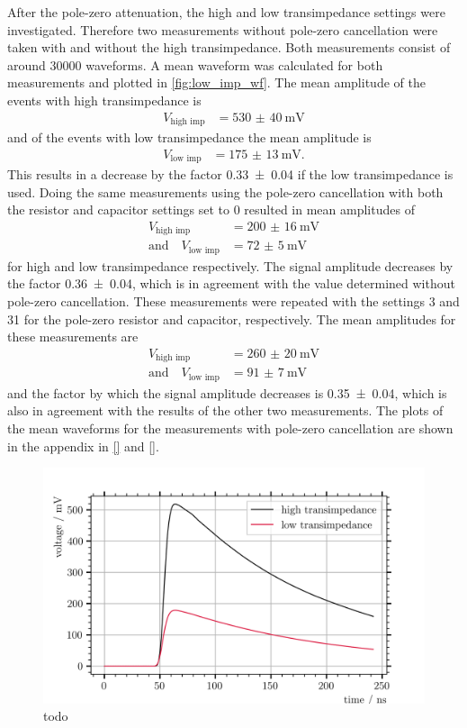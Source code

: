 After the pole-zero attenuation, the high and low transimpedance settings were investigated.
Therefore two measurements without pole-zero cancellation were taken with and without the high transimpedance.
Both measurements consist of around \num{30000} waveforms.
A mean waveform was calculated for both measurements and plotted in \autoref{fig:low_imp_wf}.
The mean amplitude of the events with high transimpedance is
\begin{align}
	V_\text{high imp} &= \SI{530(40)}{\milli\volt}
\end{align}
and of the events with low transimpedance the mean amplitude is
\begin{align}
	V_\text{low imp} &= \SI{175(13)}{\milli\volt}.
\end{align}
This results in a decrease by the factor \num{0.33(4)} if the low transimpedance is used.
Doing the same measurements using the pole-zero cancellation with both the resistor and capacitor settings set to 0 resulted in mean amplitudes of
\begin{align}
	V_\text{high imp} &= \SI{200(16)}{\milli\volt}\\
	\text{and}\quad V_\text{low imp} &= \SI{72(5)}{\milli\volt}
\end{align}
for high and low transimpedance respectively.
The signal amplitude decreases by the factor \num{0.36(4)}, which is in agreement with the value determined without pole-zero cancellation.
These measurements were repeated with the settings 3 and 31 for the pole-zero resistor and capacitor, respectively.
The mean amplitudes for these measurements are
\begin{align}
	V_\text{high imp} &= \SI{260(20)}{\milli\volt}\\
	\text{and}\quad V_\text{low imp} &= \SI{91(7)}{\milli\volt}
\end{align}
and the factor by which the signal amplitude decreases is \num{0.35(4)}, which is also in agreement with the results of the other two measurements.
The plots of the mean waveforms for the measurements with pole-zero cancellation are shown in the appendix in \autoref{} and \autoref{}.
\begin{figure}
	\centering
	\includegraphics[width=1.\textwidth]{pictures/low_imp_mean_wf}
	\caption[todo]{todo}
	\label{fig:low_imp_wf}
\end{figure}

